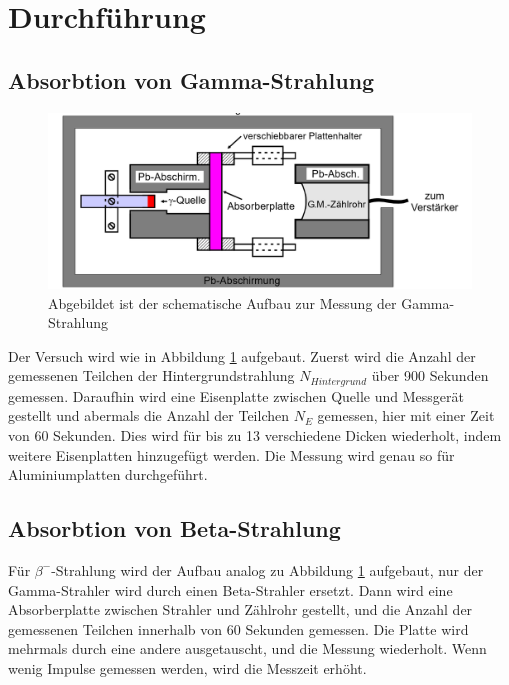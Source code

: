 \section{Durchführung}
\label{sec:Durchführung}

\subsection{Absorbtion von Gamma-Strahlung}
\begin{figure}
\includegraphics[width=\textwidth]{Bilder/Aufbau.png}
\caption{Abgebildet ist der schematische Aufbau zur Messung der Gamma-Strahlung}
\label{fig:Aufbau}
\end{figure}

Der Versuch wird wie in Abbildung \ref{fig:Aufbau} aufgebaut.
Zuerst wird die Anzahl der gemessenen Teilchen der Hintergrundstrahlung $N_{Hintergrund}$ über 900 Sekunden gemessen. 
Daraufhin wird eine Eisenplatte zwischen Quelle und Messgerät gestellt und abermals die Anzahl der Teilchen $N_E$ gemessen, hier mit einer Zeit von 60 Sekunden.
Dies wird für bis zu 13 verschiedene Dicken wiederholt, indem weitere Eisenplatten hinzugefügt werden.
Die Messung wird genau so für Aluminiumplatten durchgeführt. 

\subsection{Absorbtion von Beta-Strahlung}
Für $\beta^{-}$-Strahlung wird der Aufbau analog zu Abbildung \ref{fig:Aufbau} aufgebaut, nur der Gamma-Strahler wird durch einen Beta-Strahler ersetzt.
Dann wird eine Absorberplatte zwischen Strahler und Zählrohr gestellt, und die Anzahl der gemessenen Teilchen innerhalb von 60 Sekunden gemessen.
Die Platte wird mehrmals durch eine andere ausgetauscht, und die Messung wiederholt. 
Wenn wenig Impulse gemessen werden, wird die Messzeit erhöht.